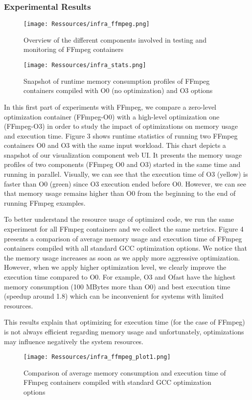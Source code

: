 \subsubsection{Experimental Results}
\begin{figure}[!t]
	\centering
	\texttt{[image: Ressources/infra\_ffmpeg.png]}
	\caption{Overview of the different components involved in testing and monitoring of FFmpeg containers}
\end{figure}


\begin{figure}[tbh]
	\texttt{[image: Ressources/infra\_stats.png]}
	\caption{Snapshot of runtime memory consumption profiles of FFmpeg containers compiled with O0 (no optimization) and O3 options}
\end{figure}

In this first part of experiments with FFmpeg, we compare a zero-level optimization container (FFmpeg-O0) with a high-level optimization one (FFmpeg-O3) in order to study the impact of optimizations on memory usage and execution time. Figure 3 shows runtime statistics of running two FFmpeg containers O0 and O3 with the same input workload. This chart depicts a snapshot of our visualization component web UI. It presents the memory usage profiles of two components (FFmpeg O0 and O3) started in the same time and running in parallel. Visually, we can see that the execution time of O3 (yellow) is faster than O0 (green) since O3 execution ended before O0. However, we can see that memory usage remains higher than O0 from the beginning to the end of running FFmpeg examples. 

To better understand the resource usage of optimized code, we run the same experiment for all FFmpeg containers and we collect the same metrics. Figure 4 presents a comparison of average memory usage and execution time of FFmpeg containers compiled with all standard GCC optimization options. We notice that the memory usage increases as soon as we apply more aggressive optimization. However, when we apply higher optimization level, we clearly improve the execution time compared to O0. For example, O3 and Ofast have the highest memory consumption (100 MBytes more than O0) and best execution time (speedup around 1.8) which can be inconvenient for systems with limited resources.

This results explain that optimizing for execution time (for the case of FFmpeg) is not always efficient regarding memory usage and unfortunately, optimizations may influence negatively the system resources.
\begin{figure}[hbt]
	\centering
	\texttt{[image: Ressources/infra\_ffmpeg\_plot1.png]}
	\caption{Comparison of average memory consumption and execution time of FFmpeg containers compiled with standard GCC optimization options}
\end{figure}


